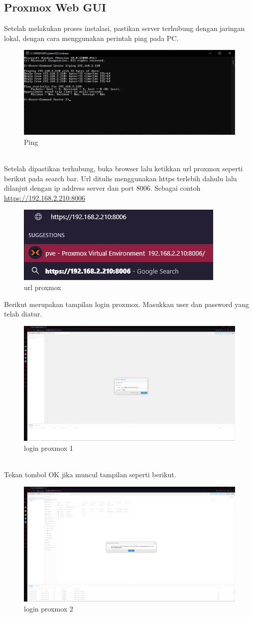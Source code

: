 \documentclass{article}
\begin{document}
  \subsection{Proxmox Web GUI}
  Setelah melakukan proses instalasi, pastikan server terhubung dengan jaringan lokal,
  dengan cara menggunakan perintah ping pada PC.
  \begin{figure}[h!]
    \centering
    \includegraphics[width=0.7\linewidth]{cmd.png}
    \caption{Ping}
  \end{figure}
  \\ Setelah dipastikan terhubung, buka browser lalu ketikkan url proxmox seperti berikut pada search bar.
  Url ditulis menggunakan https terlebih dahulu lalu dilanjut dengan ip address server dan port 8006. Sebagai contoh
  \url{https://192.168.2.210:8006}
  \begin{figure}[h!]
    \centering
    \includegraphics[width=0.7\linewidth]{url proxmox.png}
    \caption{url proxmox}
  \end{figure}
  \newpage
  Berikut merupakan tampilan login proxmox. Masukkan user dan password yang telah diatur.
  \begin{figure}[h!]
    \centering
    \includegraphics[width=0.7\linewidth]{login proxmox 1.png}
    \caption{login proxmox 1}
  \end{figure}
  \\ Tekan tombol OK jika muncul tampilan seperti berikut.
  \begin{figure}[h!]
    \centering
    \includegraphics[width=0.7\linewidth]{login proxmox 2.png}
    \caption{login proxmox 2}
  \end{figure}
\end{document}
